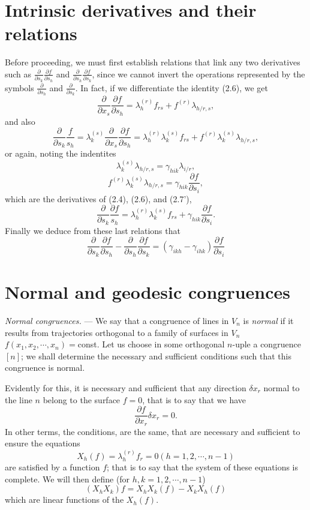 \documentclass{book}
\begin{document}
\section{Intrinsic derivatives and their relations}
Before proceeding, we must first establish relations that link any two derivatives such as $\displaystyle\frac{\partial}{\partial s_k}\frac{\partial f}{\partial s_h}$ and $\displaystyle\frac{\partial}{\partial s_h}\frac{\partial f}{\partial s_k}$, since we cannot invert the operations represented by the symbols $\displaystyle\frac{\partial}{\partial s_h}$ and $\displaystyle\frac{\partial}{\partial s_k}$. In fact, if we differentiate the identity (2.6), we get 
$$\frac{\partial}{\partial x_s}\frac{\partial f}{\partial s_h}=\lambda_h^{(r)}f_{rs}+f^{(r)}\lambda_{h/r,s},$$
and also
$$\frac{\partial}{\partial s_k}\frac{f}{s_h}=\lambda^{(s)}_k\frac{\partial}{\partial x_s}\frac{\partial f}{\partial s_h}=\lambda^{(r)}_h\lambda^{(s)}_kf_{rs}+f^{(r)}\lambda_k^{(s)}\lambda_{h/r,s},$$
or again, noting the indentites
$$\lambda^{(s)}_k\lambda_{h/r,s}=\gamma_{hik}\lambda_{i/r},$$
$$f^{(r)}\lambda_k^{(s)}\lambda_{h/r,s}=\gamma_{hik}\frac{\partial f}{\partial s_i},$$
which are the derivatives of (2.4), (2.6), and (2.7'),
$$\frac{\partial}{\partial s_k}\frac{\partial f}{s_h}=\lambda^{(r)}_h\lambda_k^{(s)}f_{rs}+\gamma_{hik}\frac{\partial f}{\partial s_i}.$$
Finally we deduce from these last relations that
\begin{equation}
\frac{\partial}{\partial s_k}\frac{\partial f}{\partial s_h}-\frac{\partial}{\partial s_h}\frac{\partial f}{\partial s_k}=(\gamma_{ikh}-\gamma_{ihk})\frac{\partial f}{\partial s_i}
\end{equation}
\section{Normal and geodesic congruences}
\emph{Normal congruences.} --- We say that a congruence of lines in $V_n$ is \emph{normal} if it results from trajectories orthogonal to a family of surfaces in $V_n$ $f(x_1,x_2,\cdots,x_n)=$const. Let us choose in some orthogonal $n$-uple a congruence $[n]$; we shall determine the necessary and sufficient conditions such that this congruence is normal. 

Evidently for this, it is necessary and sufficient that any direction $\delta x_r$ normal to the line $n$ belong to the surface $f=0$, that is to say that we have
$$\frac{\partial f}{\partial x_r}\delta x_r=0.$$
In other terms, the conditions, are the same, that are necessary and sufficient to ensure the equations
$$X_h(f)=\lambda_h^{(r)}f_r=0 (h=1,2,\cdots,n-1)$$
are satisfied by a function $f$; that is to say that the system of these equations is complete. We will then define (for $h,k=1,2,\cdots,n-1$)
$$(X_hX_k)f=X_hX_k(f)-X_kX_h(f)$$
which are linear functions of the $X_h(f)$.
\end{document}
